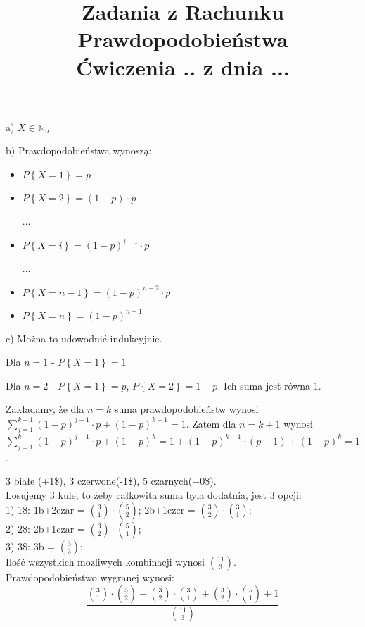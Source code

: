 \documentclass[fleqn]{article}
\begin{document}
\title{Zadania z Rachunku Prawdopodobieństwa \\ Ćwiczenia .. z dnia ...}
\date{}
\medskip
{}
\medskip

a) $X\in\mathbb{N}_n$

b) Prawdopodobieństwa wynoszą:
\begin{itemize}
\item $P\left\lbrace X=1 \right\rbrace=p$
\item $P\left\lbrace X=2 \right\rbrace=\left(1-p\right)\cdot p$

...

\item $P\left\lbrace X=i \right\rbrace=\left(1-p\right)^{i-1}\cdot p$

...

\item $P\left\lbrace X=n-1 \right\rbrace=\left(1-p\right)^{n-2}\cdot p$
\item $P\left\lbrace X=n \right\rbrace=\left(1-p\right)^{n-1}$
\end{itemize}
c) Można to udowodnić indukcyjnie.

Dla $n=1$ - $P\left\lbrace X=1 \right\rbrace=1$

Dla $n=2$ - $P\left\lbrace X=1 \right\rbrace=p$, $P\left\lbrace X=2 \right\rbrace=1-p$. Ich suma jest równa 1.

Zakładamy, że dla $n=k$ suma prawdopodobieństw wynosi $\sum\limits_{j=1}^{k-1}\left(1-p\right)^{j-1}\cdot p+\left(1-p\right)^{k-1}=1$.
Zatem dla $n=k+1$ wynosi $\sum\limits_{j=1}^{k}\left(1-p\right)^{j-1}\cdot p+\left(1-p\right)^{k}=1+\left(1-p\right)^{k-1}\cdot \left( p-1\right)+\left(1-p\right)^{k}=1$.

\medskip
{}
\medskip

3 białe (+1\$), 3 czerwone(-1\$), 5 czarnych(+0\$). \\
Losujemy 3 kule, to żeby całkowita suma byla dodatnia, jest 3 opcji: \\
1) 1\$: 1b+2czar = ${3 \choose 1} \cdot {5 \choose 2}$;  2b+1czer = ${3 \choose 2} \cdot {3 \choose 1}$; \\

2) 2\$: 2b+1czar = ${3 \choose 2} \cdot {5 \choose 1}$; \\

3) 3\$: 3b = ${3 \choose 3}$; \\

Ilość wszystkich mozliwych kombinacji wynosi ${11 \choose 3}$. \\
Prawdopodobieństwo wygranej wynosi:
\[\frac{{3 \choose 1} \cdot {5 \choose 2} + {3 \choose 2} \cdot {3 \choose 1} + {3 \choose 2} \cdot {5 \choose 1} + 1}{{11 \choose 3}}\]

\medskip
\end{document}
